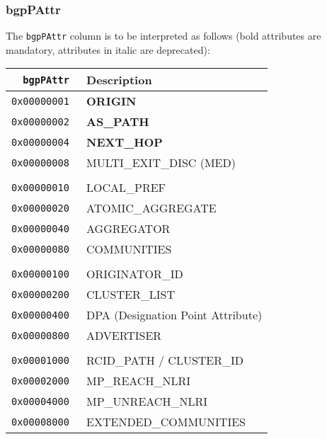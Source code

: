 \documentclass[documentation]{subfiles}
\begin{document}
\subsubsection{bgpPAttr}\label{bgpPAttr}
The {\tt bgpPAttr} column is to be interpreted as follows (bold attributes are mandatory, attributes in italic are deprecated):\\
\begin{minipage}{0.45\textwidth}
    \begin{longtable}{>{\tt}rl}
        \toprule
        {\bf bgpPAttr} & {\bf Description}\\
        \midrule\endhead%
        0x00000001 & {\bf ORIGIN}\\ %
        0x00000002 & {\bf AS\_PATH}\\ %
        0x00000004 & {\bf NEXT\_HOP}\\ %
        0x00000008 & MULTI\_EXIT\_DISC (MED)\\
        \\
        0x00000010 & LOCAL\_PREF\\
        0x00000020 & ATOMIC\_AGGREGATE\\
        0x00000040 & AGGREGATOR\\
        0x00000080 & COMMUNITIES\\
        \\
        0x00000100 & ORIGINATOR\_ID\\
        0x00000200 & CLUSTER\_LIST\\
        0x00000400 & DPA (Designation Point Attribute)\\
        0x00000800 & ADVERTISER\\
        \\
        0x00001000 & RCID\_PATH / CLUSTER\_ID\\
        0x00002000 & MP\_REACH\_NLRI\\
        0x00004000 & MP\_UNREACH\_NLRI\\
        0x00008000 & EXTENDED\_COMMUNITIES\\
        \bottomrule
    \end{longtable}
\end{minipage}
\hfill
\end{document}
